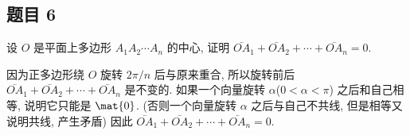 \subsection*{ 题目 6 }
\begin{problem*}
设 $O$ 是平面上多边形 $A_1 A_2 \cdots A_n$ 的中心, 证明 $\lvec{OA_1} + \lvec{OA_2} + \cdots + \lvec{OA_n} = 0$.
\end{problem*}
\begin{solution}
因为正多边形绕 $O$ 旋转 $2 \pi / n$ 后与原来重合, 所以旋转前后 $\lvec{OA_1} + \lvec{OA_2} + \cdots + \lvec{OA_n}$ 是不变的. 如果一个向量旋转 $\alpha$($0 < \alpha < \pi$) 之后和自己相等, 说明它只能是 $\mat{0}$. (否则一个向量旋转 $\alpha$ 之后与自己不共线, 但是相等又说明共线, 产生矛盾) 因此   $\lvec{OA_1} + \lvec{OA_2} + \cdots + \lvec{OA_n} = 0$.
\end{solution}

